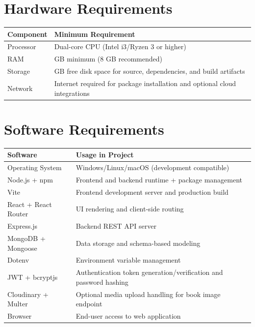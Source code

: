 \documentclass[12pt,a4paper]{report}
\begin{document}
\section{Hardware Requirements}
\begin{longtable}{>{\raggedright\arraybackslash}p{} >{\raggedright\arraybackslash}p{}}
\toprule
\textbf{Component} & \textbf{Minimum Requirement} \\
\midrule
Processor & Dual-core CPU (Intel i3/Ryzen 3 or higher) \\
RAM & 4 GB minimum (8 GB recommended) \\
Storage & 2 GB free disk space for source, dependencies, and build artifacts \\
Network & Internet required for package installation and optional cloud integrations \\
\bottomrule
\end{longtable}

\section{Software Requirements}
\begin{longtable}{>{\raggedright\arraybackslash}p{} >{\raggedright\arraybackslash}p{}}
\toprule
\textbf{Software} & \textbf{Usage in Project} \\
\midrule
Operating System & Windows/Linux/macOS (development compatible) \\
Node.js + npm & Frontend and backend runtime + package management \\
Vite & Frontend development server and production build \\
React + React Router & UI rendering and client-side routing \\
Express.js & Backend REST API server \\
MongoDB + Mongoose & Data storage and schema-based modeling \\
Dotenv & Environment variable management \\
JWT + bcryptjs & Authentication token generation/verification and password hashing \\
Cloudinary + Multer & Optional media upload handling for book image endpoint \\
Browser & End-user access to web application \\
\bottomrule
\end{longtable}
\end{document}
